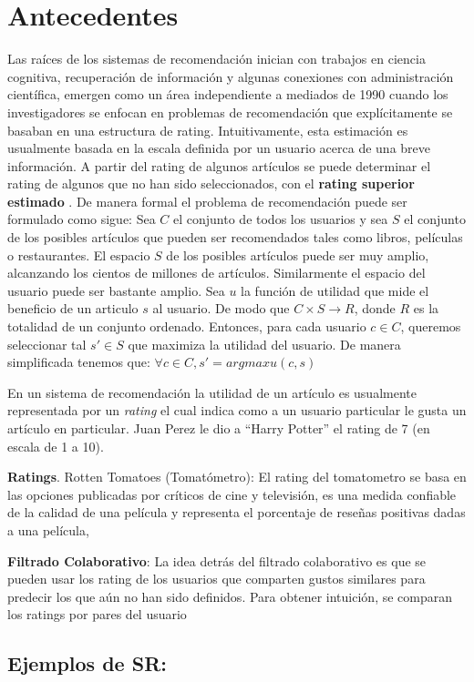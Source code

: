 \section{Antecedentes}

Las raíces de los sistemas de recomendación inician con trabajos en
ciencia cognitiva, recuperación de información y algunas conexiones con
administración científica, emergen como un área independiente a mediados
de 1990 cuando los investigadores se enfocan en problemas de
recomendación que explícitamente se basaban en una estructura de rating.
Intuitivamente, esta estimación es usualmente basada en la escala
definida por un usuario acerca de una breve información. A partir del
rating de algunos artículos se puede determinar el rating de algunos que
no han sido seleccionados, con el \textbf{rating superior estimado} . De
manera formal el problema de recomendación puede ser formulado como
sigue: Sea $C$ el conjunto de todos los usuarios y sea $S$ el
conjunto de los posibles artículos que pueden ser recomendados tales
como libros, películas o restaurantes. El espacio $S$ de los posibles
artículos puede ser muy amplio, alcanzando los cientos de millones de
artículos. Similarmente el espacio del usuario puede ser bastante
amplio. Sea $u$ la función de utilidad que mide el beneficio de un
articulo $s$ al usuario. De modo que $C \times S \rightarrow R$,
donde $R$ es la totalidad de un conjunto ordenado. Entonces, para cada
usuario $c \in C$, queremos seleccionar tal $s' \in S $ que
maximiza la utilidad del usuario. De manera simplificada tenemos que:
$\forall c \in C, s'=arg max u(c,s)$

En un sistema de recomendación la utilidad de un artículo es usualmente
representada por un \emph{rating} el cual indica como a un usuario
particular le gusta un artículo en particular. Juan Perez le dio a
``Harry Potter'' el rating de 7 (en escala de 1 a 10).

\textbf{Ratings}. Rotten Tomatoes (Tomatómetro): El rating del
tomatometro se basa en las opciones publicadas por críticos de cine y
televisión, es una medida confiable de la calidad de una película y
representa el porcentaje de reseñas positivas dadas a una película,

\textbf{Filtrado Colaborativo}: La idea detrás del filtrado colaborativo
es que se pueden usar los rating de los usuarios que comparten gustos
similares para predecir los que aún no han sido definidos. Para obtener
intuición, se comparan los ratings por pares del usuario

\subsection{ Ejemplos de SR:}


